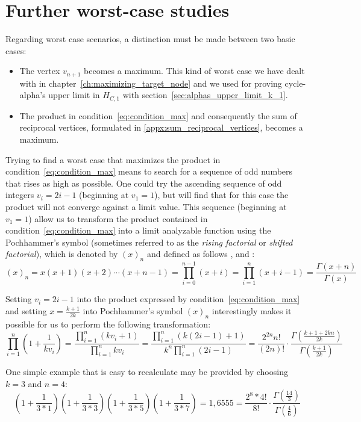 \section{Further worst-case studies}
\label{sec:worstcase_k3}
Regarding worst case scenarios, a distinction must be made between two basic cases:
\begin{itemize}
	\item The vertex $v_{n+1}$ becomes a maximum. This kind of worst case we have dealt with in chapter~\ref{ch:maximizing_target_node} and we used for proving cycle-alpha's upper limit in $H_{C,1}$ with section~\ref{sec:alphas_upper_limit_k_1}.
	\item The product in condition~\ref{eq:condition_max} and consequently the sum of reciprocal vertices, formulated in \ref{appx:sum_reciprocal_vertices}, becomes a maximum.
\end{itemize}
Trying to find a worst case that maximizes the product in condition~\ref{eq:condition_max} means to search for a sequence of odd numbers that rises as high as possible. One could try the ascending sequence of odd integers $v_i=2i-1$ (beginning at $v_1=1$), but will find that for this case the product will not converge against a limit value. This sequence (beginning at $v_1=1$) allow us to transform the product contained in condition~\ref{eq:condition_max} into a limit analyzable function using the Pochhammer’s symbol (sometimes referred to as the \textit{rising factorial} or \textit{shifted factorial}), which is denoted by $(x)_n$ and defined as follows \cite{Ref_Zwillinger_Kokoska}, \cite[p.~679]{Ref_Brychkov} and \cite[p.~1005]{Ref_Trott}:
\[
(x)_n=x(x+1)(x+2)\cdots(x+n-1)=\prod_{i=0}^{n-1}(x+i)=\prod_{i=1}^{n}(x+i-1)=\frac{\Gamma(x+n)}{\Gamma(x)}
\]

Setting $v_i=2i-1$ into the product expressed by condition~\ref{eq:condition_max} and setting $x=\frac{k+1}{2k}$ into Pochhammer’s symbol $(x)_n$ interestingly makes it possible for us to perform the following transformation:
\begin{equation}
\label{eq:pochhammer}
\prod_{i=1}^{n}\left(1+\frac{1}{kv_i}\right)
=\frac{\prod_{i=1}^{n}(kv_i+1)}{\prod_{i=1}^{n}kv_i}
=\frac{\prod_{i=1}^{n}\left(k(2i-1)+1\right)}{k^n\prod_{i=1}^{n}(2i-1)}
=\frac{2^{2n}n!}{(2n)!}\cdot\frac{\Gamma\left(\frac{k+1+2kn}{2k}\right)}{\Gamma\left(\frac{k+1}{2k}\right)}
\end{equation}

\begin{example}
	One simple example that is easy to recalculate may be provided by choosing $k=3$ and $n=4$:
	\[
	\left(1+\frac{1}{3*1}\right)\left(1+\frac{1}{3*3}\right)\left(1+\frac{1}{3*5}\right)\left(1+\frac{1}{3*7}\right)=1,6555=\frac{2^8*4!}{8!}\cdot\frac{\Gamma(\frac{14}{3})}{\Gamma(\frac{4}{6})}
	\]
\end{example}

